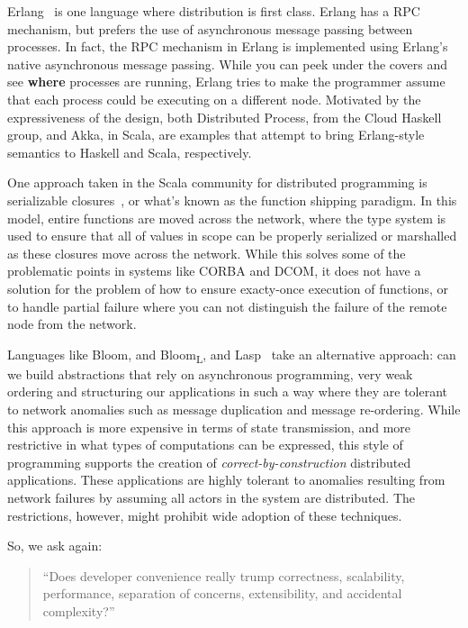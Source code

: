 Erlang~\cite{claessen2005semantics, svensson2007more, svensson2007programming} is one language where distribution is first class.  Erlang has a RPC mechanism, but prefers the use of asynchronous message passing between processes.  In fact, the RPC mechanism in Erlang is implemented using Erlang's native asynchronous message passing.  While you can peek under the covers and see \textbf{where} processes are running, Erlang tries to make the programmer assume that each process could be executing on a different node.  Motivated by the expressiveness of the design, both Distributed Process, from the Cloud Haskell group, and Akka, in Scala, are examples that attempt to bring Erlang-style semantics to Haskell and Scala, respectively.

One approach taken in the Scala community for distributed programming is serializable closures~\cite{miller2014spores}, or what's known as the function shipping paradigm.  In this model, entire functions are moved across the network, where the type system is used to ensure that all of values in scope can be properly serialized or marshalled as these closures move across the network.  While this solves some of the problematic points in systems like CORBA and DCOM, it does not have a solution for the problem of how to ensure exacty-once execution of functions, or to handle partial failure where you can not distinguish the failure of the remote node from the network.

Languages like Bloom, and Bloom\textsubscript{L}, and Lasp~\cite{alvaro2011consistency, conway2012logic, meiklejohn2015lasp} take an alternative approach: can we build abstractions that rely on asynchronous programming, very weak ordering and structuring our applications in such a way where they are tolerant to network anomalies such as message duplication and message re-ordering.  While this approach is more expensive in terms of state transmission, and more restrictive in what types of computations can be expressed, this style of programming supports the creation of \textit{correct-by-construction} distributed applications.  These applications are highly tolerant to anomalies resulting from network failures by assuming all actors in the system are distributed.  The restrictions, however, might prohibit wide adoption of these techniques.

So, we ask again:

\begin{quote}
``Does developer convenience really trump correctness, scalability,
performance, separation of concerns, extensibility, and accidental
complexity?''~\cite{vinoski2008convenience}
\end{quote}